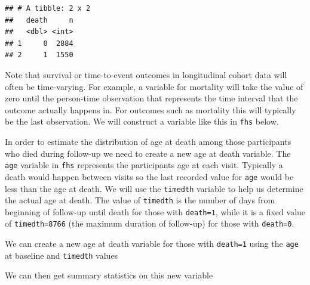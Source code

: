 \documentclass[
]{book}
\newenvironment{Shaded}{\begin{snugshade}}{\end{snugshade}}
\newcommand{\DataTypeTok}[1]{\textcolor[rgb]{0.13,0.29,0.53}{#1}}
\newcommand{\FloatTok}[1]{\textcolor[rgb]{0.00,0.00,0.81}{#1}}
\newcommand{\KeywordTok}[1]{\textcolor[rgb]{0.13,0.29,0.53}{\textbf{#1}}}
\newcommand{\NormalTok}[1]{#1}
\newcommand{\OperatorTok}[1]{\textcolor[rgb]{0.81,0.36,0.00}{\textbf{#1}}}
\newcommand{\StringTok}[1]{\textcolor[rgb]{0.31,0.60,0.02}{#1}}
\begin{document}
\begin{verbatim}
## # A tibble: 2 x 2
##   death     n
##   <dbl> <int>
## 1     0  2884
## 2     1  1550
\end{verbatim}

Note that survival or time-to-event outcomes in longitudinal cohort data will often be time-varying. For example, a variable for mortality will take the value of zero until the person-time observation that represents the time interval that the outcome actually happens in. For outcomes such as mortality this will typically be the last observation. We will construct a variable like this in \texttt{fhs} below.

In order to estimate the distribution of age at death among those participants who died during follow-up we need to create a new age at death variable. The \texttt{age} variable in \texttt{fhs} represents the participants age at each visit. Typically a death would happen between visits so the last recorded value for \texttt{age} would be less than the age at death. We will use the \texttt{timedth} variable to help us determine the actual age at death. The value of \texttt{timedth} is the number of days from beginning of follow-up until death for those with \texttt{death=1}, while it is a fixed value of \texttt{timedth=8766} (the maximum duration of follow-up) for those with \texttt{death=0}.

We can create a new age at death variable for those with \texttt{death=1} using the \texttt{age} at baseline and \texttt{timedth} values

\begin{Shaded}
\end{Shaded}

We can then get summary statistics on this new variable

\begin{Shaded}
\end{Shaded}
\end{document}
